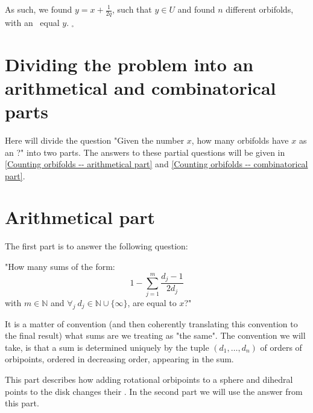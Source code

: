 As such, we found $y = x + \frac{1}{2q}$, such that $y \in U$ and 
found $n$
different orbifolds, with an \Eoc\ equal $y$. $_\square$ 
 



\section{Dividing the problem into an arithmetical and combinatorical parts}
\label{dividing the problem}
Here will divide the question "Given the number $x$, how many orbifolds have $x$ as an \Eoc?" 
into two parts. The answers to these partial questions will be given in 
\ref{Counting orbifolds -- arithmetical part} and 
\ref{Counting orbifolds -- combinatorical part}.   
\section{Arithmetical part}\label{arithmetical part}
The first part is to answer the following question:

"How many sums of the form:
\begin{equation}\label{counting D2}
1-\sum_{j=1}^m \frac{d_j-1}{2d_j} 
\end{equation} 
with $m\in \mathbb{N}$ and $\forall_j\ d_j\in\mathbb{N}\cup\{\infty\}$, are equal to $x$?"

It is a matter of convention (and then coherently translating this convention to the final result) 
what sums are we treating as "the same". The convention we will take, is that a sum is determined 
uniquely by the tuple $(d_1,\dots,d_n)$ 
of orders 
of orbipoints, ordered in decreasing order, appearing in the sum. 

This part describes how adding rotational orbipoints to a sphere and dihedral points 
to the disk changes their \Eoc. 
In the second part we will use the answer from this part.
